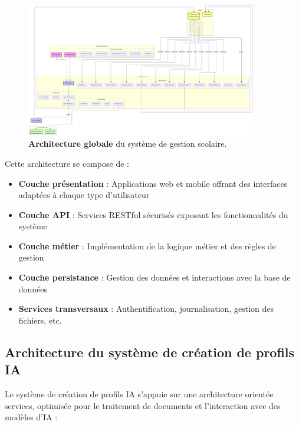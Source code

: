 \begin{figure}[H]
  \centering
  \includegraphics[width=0.9\textwidth,keepaspectratio]{pfe-pics/diagrames/archetecture.png}
  \caption{\textbf{Architecture globale} du système de gestion scolaire.}
  \label{fig:school_architecture}
\end{figure}

Cette architecture se compose de :

\begin{itemize}
  \item \textbf{Couche présentation} : Applications web et mobile offrant des interfaces adaptées à chaque type d'utilisateur
  
  \item \textbf{Couche API} : Services RESTful sécurisés exposant les fonctionnalités du système
  
  \item \textbf{Couche métier} : Implémentation de la logique métier et des règles de gestion
  
  \item \textbf{Couche persistance} : Gestion des données et interactions avec la base de données
  
  \item \textbf{Services transversaux} : Authentification, journalisation, gestion des fichiers, etc.
\end{itemize}

\subsection{Architecture du système de création de profils IA}

Le système de création de profils IA s'appuie sur une architecture orientée services, optimisée pour le traitement de documents et l'interaction avec des modèles d'IA :

